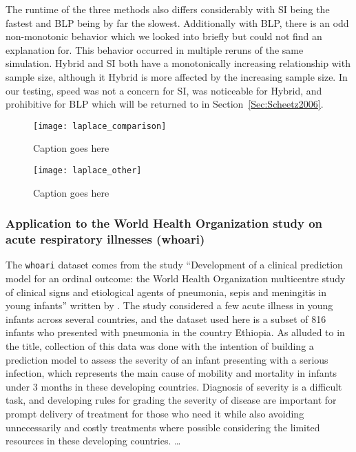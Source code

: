 The runtime of the three methods also differs considerably with SI being the fastest and BLP being by far the slowest. Additionally with BLP, there is an odd non-monotonic behavior which we looked into briefly but could not find an explanation for. This behavior occurred in multiple reruns of the same simulation. Hybrid and SI both have a monotonically increasing relationship with sample size, although it Hybrid is more affected by the increasing sample size. In our testing, speed was not a concern for SI, was noticeable for Hybrid, and prohibitive for BLP which will be returned to in Section~\ref{Sec:Scheetz2006}.

\begin{figure}[hbtp]
  \texttt{[image: laplace\_comparison]}
  \caption{\label{Fig:laplace_comparison} Caption goes here}
\end{figure}


\begin{figure}[hbtp]
  \texttt{[image: laplace\_other]}
  \caption{\label{Fig:laplace_other} Caption goes here}
\end{figure}


\subsubsection{Application to the World Health Organization study on acute respiratory illnesses (whoari)}


The \texttt{whoari} dataset comes from the study ``Development of a clinical prediction model for an ordinal outcome: the World Health Organization multicentre study of clinical signs and etiological agents of pneumonia, sepis and meningitis in young infants'' written by \cite{Harrell1998}. The study considered a few acute illness in young infants across several countries, and the dataset used here is a subset of 816 infants who presented with pneumonia in the country Ethiopia. As alluded to in the title, collection of this data was done with the intention of building a prediction model to assess the severity of an infant presenting with a serious infection, which represents the main cause of mobility and mortality in infants under 3 months in these developing countries. Diagnosis of severity is a difficult task, and developing rules for grading the severity of disease are important for prompt delivery of treatment for those who need it while also avoiding unnecessarily and costly treatments where possible considering the limited resources in these developing countries. \dots

